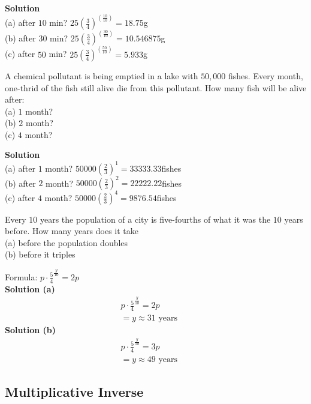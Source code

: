 \textbf{Solution} \\
(a) after $10$ min? $25{(\frac{3}{4})}^{(\frac{10}{10})} = 18.75$g \\
(b) after $30$ min? $25{(\frac{3}{4})}^{(\frac{30}{10})} = 10.546875$g \\
(c) after $50$ min? $25{(\frac{3}{4})}^{(\frac{50}{10})} = 5.933$g

\begin{tcolorbox}[title=Problem 20, breakable]
A chemical pollutant is being emptied in a  lake with $50,000$ fishes. Every month, 
one-thrid of the fish still alive die from this pollutant. How many fish will be 
alive after: \\
(a) $1$ month? \\
(b) $2$ month? \\
(c) $4$ month?
\end{tcolorbox}

\textbf{Solution} \\
(a) after $1$ month? $50000{(\frac{2}{3})}^{1} = 33333.33$fishes \\
(b) after $2$ month? $50000{(\frac{2}{3})}^{2} = 22222.22$fishes \\
(c) after $4$ month? $50000{(\frac{2}{3})}^{4} = 9876.54$fishes


\begin{tcolorbox}[title=Problem 21, breakable]
Every $10$ years the population of a city is five-fourths of what it was the $10$
years before. How many years does it take \\
(a) before the population doubles \\
(b) before it triples
\end{tcolorbox}

Formula: $p \cdot \frac{5}{4}^{\frac{y}{10}} = 2p$ \\
\textbf{Solution (a)}
\begin{align*}
p \cdot \frac{5}{4}^{\frac{y}{10}} = 2p && \\
= y \approx 31\text{ years}
\end{align*}
\textbf{Solution (b)}
\begin{align*}
p \cdot \frac{5}{4}^{\frac{y}{10}} = 3p && \\
= y \approx 49\text{ years}
\end{align*}

\subsection{Multiplicative Inverse}

